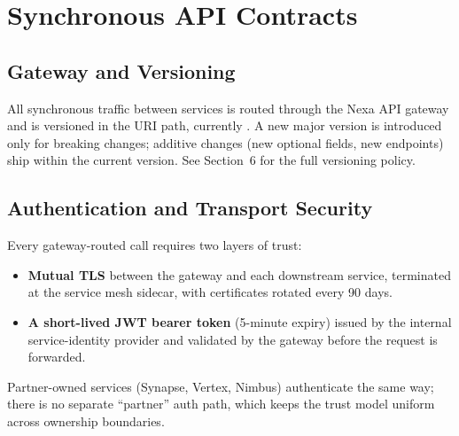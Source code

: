 \section{Synchronous API Contracts}

\subsection{Gateway and Versioning}
All synchronous traffic between services is routed through the Nexa API gateway and is
versioned in the URI path, currently . A new major version is introduced only for
breaking changes; additive changes (new optional fields, new endpoints) ship within the
current version. See Section~6 for the full versioning policy.

\subsection{Authentication and Transport Security}
Every gateway-routed call requires two layers of trust:
\begin{itemize}[leftmargin=1.6em]
  \item \textbf{Mutual TLS} between the gateway and each downstream service, terminated at the
    service mesh sidecar, with certificates rotated every 90 days.
  \item \textbf{A short-lived JWT bearer token} (5-minute expiry) issued by the internal
    service-identity provider and validated by the gateway before the request is forwarded.
\end{itemize}
Partner-owned services (Synapse, Vertex, Nimbus) authenticate the same way; there is no
separate ``partner'' auth path, which keeps the trust model uniform across ownership
boundaries.

